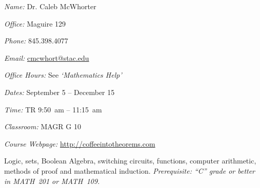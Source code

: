 \documentclass[11pt,letterpaper]{article}
\makeatletter
\newcommand{\classdates}{September 5 -- December 15}
\newcommand{\classtimes}{TR 9:50~am -- 11:15~am}
\newcommand{\classroom}{MAGR G 10}
\newcommand{\instructor}{Dr. Caleb McWhorter}
\newcommand{\office}{Maguire 129}
\newcommand{\phone}{845.398.4077}
\newcommand{\email}{cmcwhort@stac.edu}
\newcommand{\website}{http://coffeeintotheorems.com}
\newcommand{\officehours}{See \textit{`Mathematics Help'}}
\makeatother
\begin{document}




\textit{Name:} \instructor \par
\textit{Office:} \office \par
\textit{Phone:} \phone \par
\textit{Email:} \href{mailto:\email}{\email} \par
\textit{Office Hours:} \officehours 
\sectionbreak



\textit{Dates:} \classdates \par
\textit{Time:} \classtimes \par
\textit{Classroom:} \classroom \par
\textit{Course Webpage:} \href{\website}{\website}
\sectionbreak





\newpage




Logic, sets, Boolean Algebra, switching circuits, functions, computer arithmetic, methods of proof and mathematical induction. {\itshape Prerequisite: ``C'' grade or better in MATH~201 or MATH~109.}
\sectionbreak
\end{document}
